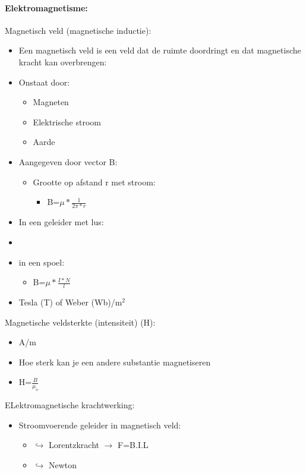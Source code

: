 \documentclass[12pt]{article}
\begin{document}
\paragraph{Elektromagnetisme:}
Magnetisch veld (magnetische inductie):\begin{itemize}
    \item Een magnetisch veld is een veld dat de ruimte doordringt en dat magnetische kracht kan overbrengen:
    \item Onstaat door:\begin{itemize}
        \item Magneten 
        \item Elektrische stroom 
        \item Aarde
        \end{itemize}
    \item Aangegeven door vector B:\begin{itemize}
        \item Grootte op afstand r met stroom:\begin{itemize}
            \item B=$\mu *\frac{1}{2\pi*r}$
        \end{itemize}
    \end{itemize}
    \item In een geleider met lus:
    \item \item in een spoel:\begin{itemize}
        \item B=$\mu*\frac{I*N}{l}$
    \end{itemize}
    \item Tesla (T) of Weber (Wb)/m$^2$
\end{itemize}
Magnetische veldsterkte (intensiteit) (H):\begin{itemize}
    \item A/m 
    \item Hoe sterk kan je een andere substantie magnetiseren 
    \item H=$\frac{B}{\mu_o}$
\end{itemize}
ELektromagnetische krachtwerking:\begin{itemize}
    \item Stroomvoerende geleider in magnetisch veld:\begin{itemize}
        \item $\hookrightarrow$ Lorentzkracht $\rightarrow$ F=B.I.L
        \item $\hookrightarrow$ Newton
    \end{itemize}
\end{itemize}
\end{document}
